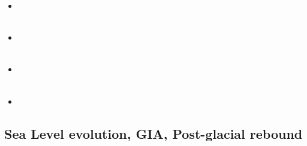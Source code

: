\begin{scriptsize}
\begin{itemize}
\item[\twothousandsixteen] 
\textcite{masg16} \\
\textcite{albe16} \\
\item[\twothousandseventeen] 
\textcite{grbe17} \\
\textcite{henf17} \\
\item[\twothousandnineteen] 
\textcite{hadv19} \\
\textcite{clcc19} \\
\item[\twothousandtwentyone]
\textcite{haao21} \\ 
\end{itemize}
\end{scriptsize}

\subsection{Sea Level evolution, GIA, Post-glacial rebound}


